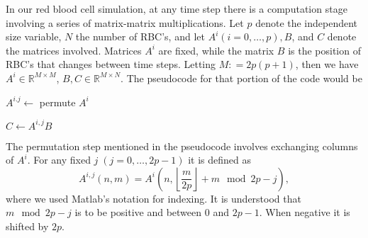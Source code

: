 \documentclass[11pt]{article}
\def\defeq{\mathrel{\mathop :}=}
\def\R{\mathbb{R}}
\begin{document}
In our red blood cell simulation, at any time step there is a
computation stage involving a series of matrix-matrix multiplications.
Let $p$ denote the independent size variable, $N$ the number of RBC's,
and let $A^i (i=0, \dots, p), B$, and $C$ denote the matrices
involved.  Matrices $A^i$ are fixed, while the matrix $B$ is the
position of RBC's that changes between time steps. Letting $M \defeq
2p(p+1)$, then we have $A^i \in \R^{M\times M}$, $B, C \in \R^{M\times
 N}$. The pseudocode for that portion of the code would be

\begin{algorithm}[!hbt]
  \begin{algorithmic}

      \STATE $A^{i.j} \leftarrow$ permute $A^i$

      \STATE $C\leftarrow A^{i,j} B$


      \ENDFOR
    \ENDFOR
  \end{algorithmic}
\end{algorithm}

The permutation step mentioned in the pseudocode involves exchanging
columns of $A^i$. For any fixed $j\;(j=0,\dots,2p-1)$ it is defined as
\[A^{i,j}(n,m) = A^i\left(n, \left\lfloor \frac{m}{2p} \right\rfloor +
  m\mod 2p - j \right),\] where we used Matlab's notation for
indexing. It is understood that $m\mod 2p - j$ is to be positive and
between $0$ and $2p-1$. When negative it is shifted by $2p$.
\end{document}
